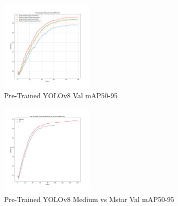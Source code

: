 \documentclass[10pt,twocolumn,letterpaper]{article}
\begin{document}
\begin{figure}
    \centering
    \includegraphics[width=0.4\textwidth]{figures/Pre-Trained YOLOv8 Val mAP50-95.png}
    \caption{Pre-Trained YOLOv8 Val mAP50-95}
    \label{fig:YOLOv8_mAP50-95_val}
\end{figure}
\begin{figure}
    \centering
    \includegraphics[width=0.4\textwidth]{figures/Pre-Trained YOLOv8 Medium vs Mstar Val mAP50-95.png}
    \caption{Pre-Trained YOLOv8 Medium vs Mstar Val mAP50-95}
    \label{fig:M_mAP50-95_val}
\end{figure}
\end{document}
